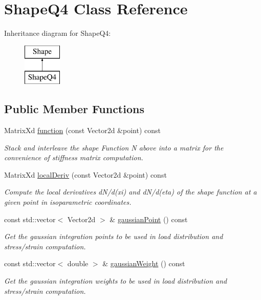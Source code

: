\hypertarget{class_shape_q4}{}\section{Shape\+Q4 Class Reference}
\label{class_shape_q4}
Inheritance diagram for Shape\+Q4\+:\begin{figure}[H]
\begin{center}
\leavevmode
\includegraphics[height=2.000000cm]{class_shape_q4}
\end{center}
\end{figure}
\subsection*{Public Member Functions}
\begin{DoxyCompactItemize}
\item 
Matrix\+Xd \mbox{\hyperlink{class_shape_q4_a306cacfd4d87384b3d06c2788cafd4ba}{function}} (const Vector2d \&point) const
\begin{DoxyCompactList}\small\item\em Stack and interleave the shape Function N above into a matrix for the convenience of stiffness matrix computation. \end{DoxyCompactList}\item 
Matrix\+Xd \mbox{\hyperlink{class_shape_q4_ad3e1f5e25aee96cd21b1c8770c35afd0}{local\+Deriv}} (const Vector2d \&point) const
\begin{DoxyCompactList}\small\item\em Compute the local derivatives d\+N/d(xi) and d\+N/d(eta) of the shape function at a given point in isoparametric coordinates. \end{DoxyCompactList}\item 
const std\+::vector$<$ Vector2d $>$ \& \mbox{\hyperlink{class_shape_q4_a5c185036352eabf489007b92f6d48ad2}{gaussian\+Point}} () const
\begin{DoxyCompactList}\small\item\em Get the gaussian integration points to be used in load distribution and stress/strain computation. \end{DoxyCompactList}\item 
const std\+::vector$<$ double $>$ \& \mbox{\hyperlink{class_shape_q4_a51233dd1caaabbe8404c06b5b0db5755}{gaussian\+Weight}} () const
\begin{DoxyCompactList}\small\item\em Get the gaussian integration weights to be used in load distribution and stress/strain computation. \end{DoxyCompactList}\end{DoxyCompactItemize}


